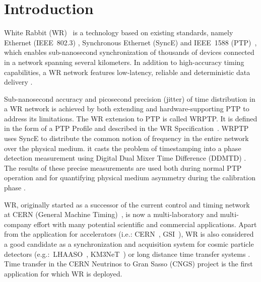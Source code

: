 \section{Introduction}


White Rabbit (WR)~\cite{biblio:whiteRabbit} is a technology based on existing standards, namely
Ethernet (IEEE~802.3) \cite{biblio:IEEE8023}, Synchronous Ethernet (SyncE) \cite{biblio:SynchE}
and IEEE~1588 (PTP)~\cite{biblio:IEEE1588}, which enables sub-nanosecond synchronization of 
thousands of devices connected in a network spanning several kilometers. In addition to high-accuracy 
timing capabilities, a WR network features low-latency, reliable and deterministic data delivery 
\cite{biblio:ICALEPCS2011}.

Sub-nanosecond accuracy and picosecond precision (jitter) of time distribution in a WR network is 
achieved by both extending and hardware-supporting PTP to address its limitations. The WR extension to PTP
is called WRPTP. It is defined in the form of a PTP Profile \cite{biblio:ISPCS2011} and described in the 
WR Specification~\cite{biblio:WRPTP}. WRPTP uses SyncE to distribute the common notion of 
frequency in the entire network over the physical medium. 
it casts the problem of timestamping 
into a phase detection measurement using Digital Dual Mixer Time Difference (DDMTD) 
\cite{biblio:DDMTD}\cite{biblio:WRproject}. The results of these precise measurements are used both during 
normal PTP operation and for quantifying physical medium asymmetry during the calibration phase 
\cite{biblio:TomekMSc}.

WR, originally started as a successor of the current control and timing network at 
CERN (General Machine Timing)~\cite{biblio:GMT}, is now a multi-laboratory and multi-company 
effort with many potential scientific and commercial applications. Apart from the application
for accelerators (i.e.: CERN~\cite{biblio:WRproject}, GSI~\cite{biblio:FAIRtimingSystem}),
WR is also considered a good candidate as a synchronization and acquisition system for 
cosmic particle detectors (e.g.:~LHAASO~\cite{biblio:LHAASO}, KM3NeT~\cite{biblio:KM3NeT}) or long distance 
time transfer systems \cite{biblio:TWTFT}. Time transfer in the CERN Neutrinos to Gran Sasso (CNGS) 
project is the first application for which WR is deployed. 

